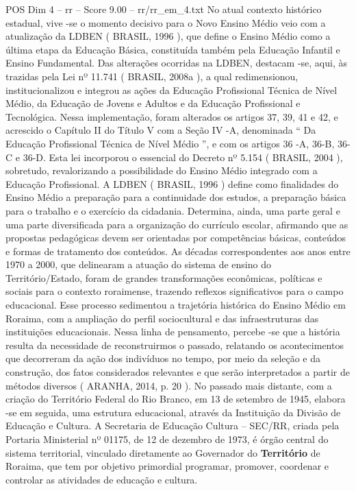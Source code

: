 \begin{textsample}{POS Dim 4 – rr – Score 9.00 – rr/rr\_em\_4.txt}
No atual contexto histórico estadual, vive -se o momento decisivo para o Novo Ensino Médio veio com a atualização da LDBEN ( BRASIL, 1996 ), que define o Ensino Médio como a última etapa da Educação Básica, constituída também pela Educação Infantil e Ensino Fundamental.
Das alterações ocorridas na LDBEN, destacam -se, aqui, às trazidas pela Lei nº 11.741 ( BRASIL, 2008a ), a qual redimensionou, institucionalizou e integrou as ações da Educação Profissional Técnica de Nível Médio, da Educação de Jovens e Adultos e da Educação Profissional e Tecnológica.
Nessa implementação, foram alterados os artigos 37, 39, 41 e 42, e acrescido o Capítulo II do Título V com a Seção IV -A, denominada “ Da Educação Profissional Técnica de Nível Médio ”, e com os artigos 36 -A, 36-B, 36-C e 36-D.
Esta lei incorporou o essencial do Decreto nº 5.154 ( BRASIL, 2004 ), sobretudo, revalorizando a possibilidade do Ensino Médio integrado com a Educação Profissional.
A LDBEN ( BRASIL, 1996 ) define como finalidades do Ensino Médio a preparação para a continuidade dos estudos, a preparação básica para o trabalho e o exercício da cidadania.
Determina, ainda, uma parte geral e uma parte diversificada para a organização do currículo escolar, afirmando que as propostas pedagógicas devem ser orientadas por competências básicas, conteúdos e formas de tratamento dos conteúdos.
As décadas correspondentes aos anos entre 1970 a 2000, que delinearam a atuação do sistema de ensino do Território/Estado, foram de grandes transformações econômicas, políticas e sociais para o contexto roraimense, trazendo reflexos significativos para o campo educacional.
Esse processo sedimentou a trajetória histórica do Ensino Médio em Roraima, com a ampliação do perfil sociocultural e das infraestruturas das instituições educacionais.
Nessa linha de pensamento, percebe -se que a história resulta da necessidade de reconstruirmos o passado, relatando os acontecimentos que decorreram da ação dos indivíduos no tempo, por meio da seleção e da construção, dos fatos considerados relevantes e que serão interpretados a partir de métodos diversos ( ARANHA, 2014, p. 20 ).
No passado mais distante, com a criação do Território Federal do Rio Branco, em 13 de setembro de 1945, elabora -se em seguida, uma estrutura educacional, através da Instituição da Divisão de Educação e Cultura.
A Secretaria de Educação Cultura – SEC/RR, criada pela Portaria Ministerial nº 01175, de 12 de dezembro de 1973, é órgão central do sistema territorial, vinculado diretamente ao Governador do \textbf{Território} de Roraima, que tem por objetivo primordial programar, promover, coordenar e controlar as atividades de educação e cultura.

\end{textsample}
